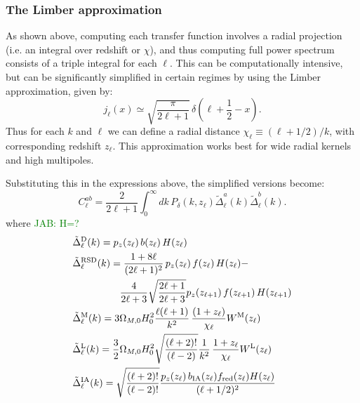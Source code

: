 \documentclass[\docopts]{\docclass}
\newcommand{\jab}[1]{\textcolor{green}{JAB: #1}}
\begin{document}
\subsubsection{The Limber approximation}
As shown above, computing each transfer function involves a radial projection (i.e. an integral over redshift or $\chi$), and thus computing full power spectrum consists of a triple integral for each $\ell$. This can be computationally intensive, but can be significantly simplified in certain regimes by using the Limber approximation, given by:
\begin{equation}
 j_\ell(x)\simeq\sqrt{\frac{\pi}{2\ell+1}}\,\delta\left(\ell+\frac{1}{2}-x\right).
\end{equation}
Thus for each $k$ and $\ell$ we can define a radial distance $\chi_\ell\equiv(\ell+1/2)/k$, with corresponding redshift $z_\ell$. This approximation works best for wide radial kernels and high multipoles.

Substituting this in the expressions above, the simplified versions become:
\begin{equation}
 C^{ab}_\ell=\frac{2}{2\ell+1}\int_0^\infty dk\,P_\delta\left(k,z_\ell\right)
 \tilde{\Delta}^a_\ell(k)\tilde{\Delta}^b_\ell(k).
\end{equation}
where \jab{H=?}
\begin{align}
 &\tilde{\Delta}_\ell^{\rm D}(k)=p_z(z_\ell)\,b(z_\ell)\,H(z_\ell)\\
 &\tilde{\Delta}_\ell^{\rm RSD}(k)=
 \frac{1+8\ell}{(2\ell+1)^2}\,p_z(z_\ell)\,f(z_\ell)\,H(z_\ell)-\\
 &\hspace{48pt}\frac{4}{2\ell+3}\sqrt{\frac{2\ell+1}{2\ell+3}}p_z(z_{\ell+1})\,f(z_{\ell+1})\,H(z_{\ell+1})\\
 &\tilde{\Delta}_\ell^{\rm M}(k)=3\Omega_{M,0}H_0^2\frac{\ell(\ell+1)}{k^2}\,
 \frac{(1+z_\ell)}{\chi_\ell}W^{\rm M}(z_\ell)\\
 &\tilde{\Delta}_\ell^{\rm L}(k)=\frac{3}{2}\Omega_{M,0}H_0^2\sqrt{\frac{(\ell+2)!}{(\ell-2)}}\frac{1}{k^2}\,
 \frac{1+z_\ell}{\chi_\ell}W^{\rm L}(z_\ell)\\
 &\tilde{\Delta}_\ell^{\rm IA}(k)=\sqrt{\frac{(\ell+2)!}{(\ell-2)!}}\frac{p_z(z_\ell)\,b_{\rm IA}(z_\ell)f_{\rm red}(z_\ell)H(z_\ell)}{(\ell+1/2)^2}
\end{align}
\end{document}
